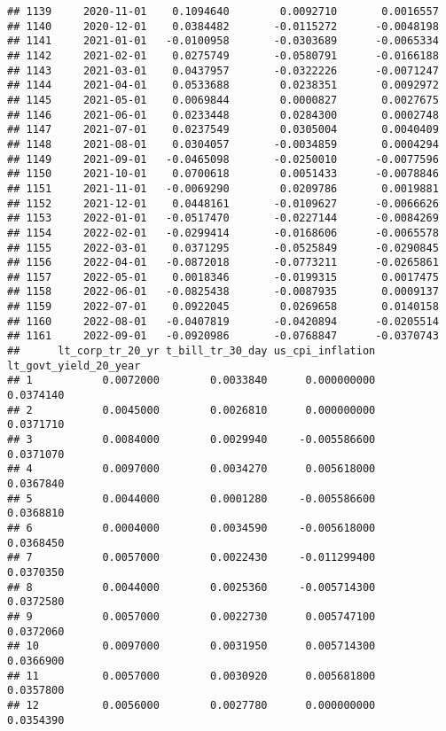 \documentclass[
]{article}
\begin{document}
\begin{verbatim}
## 1139     2020-11-01    0.1094640        0.0092710       0.0016557
## 1140     2020-12-01    0.0384482       -0.0115272      -0.0048198
## 1141     2021-01-01   -0.0100958       -0.0303689      -0.0065334
## 1142     2021-02-01    0.0275749       -0.0580791      -0.0166188
## 1143     2021-03-01    0.0437957       -0.0322226      -0.0071247
## 1144     2021-04-01    0.0533688        0.0238351       0.0092972
## 1145     2021-05-01    0.0069844        0.0000827       0.0027675
## 1146     2021-06-01    0.0233448        0.0284300       0.0002748
## 1147     2021-07-01    0.0237549        0.0305004       0.0040409
## 1148     2021-08-01    0.0304057       -0.0034859       0.0004294
## 1149     2021-09-01   -0.0465098       -0.0250010      -0.0077596
## 1150     2021-10-01    0.0700618        0.0051433      -0.0078846
## 1151     2021-11-01   -0.0069290        0.0209786       0.0019881
## 1152     2021-12-01    0.0448161       -0.0109627      -0.0066626
## 1153     2022-01-01   -0.0517470       -0.0227144      -0.0084269
## 1154     2022-02-01   -0.0299414       -0.0168606      -0.0065578
## 1155     2022-03-01    0.0371295       -0.0525849      -0.0290845
## 1156     2022-04-01   -0.0872018       -0.0773211      -0.0265861
## 1157     2022-05-01    0.0018346       -0.0199315       0.0017475
## 1158     2022-06-01   -0.0825438       -0.0087935       0.0009137
## 1159     2022-07-01    0.0922045        0.0269658       0.0140158
## 1160     2022-08-01   -0.0407819       -0.0420894      -0.0205514
## 1161     2022-09-01   -0.0920986       -0.0768847      -0.0370743
##      lt_corp_tr_20_yr t_bill_tr_30_day us_cpi_inflation lt_govt_yield_20_year
## 1           0.0072000        0.0033840      0.000000000             0.0374140
## 2           0.0045000        0.0026810      0.000000000             0.0371710
## 3           0.0084000        0.0029940     -0.005586600             0.0371070
## 4           0.0097000        0.0034270      0.005618000             0.0367840
## 5           0.0044000        0.0001280     -0.005586600             0.0368810
## 6           0.0004000        0.0034590     -0.005618000             0.0368450
## 7           0.0057000        0.0022430     -0.011299400             0.0370350
## 8           0.0044000        0.0025360     -0.005714300             0.0372580
## 9           0.0057000        0.0022730      0.005747100             0.0372060
## 10          0.0097000        0.0031950      0.005714300             0.0366900
## 11          0.0057000        0.0030920      0.005681800             0.0357800
## 12          0.0056000        0.0027780      0.000000000             0.0354390

\end{verbatim}
\end{document}

